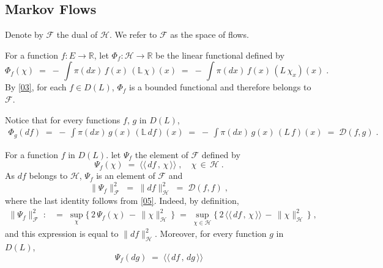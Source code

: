 \documentclass[reqno]{amsart}
\newcounter{as}[section]
\newcommand{\mc}[1]{{\mathcal #1}}
\newcommand{\bb}[1]{{\mathbb #1}}
\newcommand{\ms}[1]{{\mathscr #1}}
\newcommand{\<}{\langle}
\renewcommand{\>}{\rangle}
\newcommand{\cb}[1]{{\color{blue} #1}}
\newcommand{\bel}[2]{\begin{equation} \label{#1} \begin{split} #2
 					\end{split} \end{equation}}
\begin{document}
\subsection{Markov Flows}
Denote by $\ms F$ the dual of $\ms H$. We refer to $\ms F$ as the
space of flows.


For a function $f:E \to \bb R$, let $\Phi_f: \ms H \to \bb R$ be the
linear functional defined by
\begin{equation*}
\Phi_f (\chi) \;=\;- \,\int \pi(dx)\, f(x)\, (\bb L\, \chi)(x)
\;=\; - \,\int \pi(dx)\, f(x)\, ( L\, \chi_x)(x) \;.
\end{equation*}
By \eqref{03}, for each $f\in D(L)$, $\Phi_f$ is a bounded functional
and therefore belongs to $\ms F$. 

Notice that for every functions $f$, $g$ in $D(L)$,
\bel{phig}{
\Phi_g(df) \;=\; 
-\, \int \pi(dx)\, g(x)\, (\bb L \, df)(x) \;=\;
-\, \int \pi(dx)\, g(x)\, (L \, f)(x) \;=\; \mc D(f,g) \;.
}

For a function $f$ in $D(L)$. let $\Psi_f$ the element of $\ms F$
defined by
\begin{equation}
\label{06}
\Psi_f (\chi) \;=\; \<\!\<\, df \,,\, \chi \,\>\!\> \;, \quad
\chi\,\in\, \ms H\;.
\end{equation}
As $df$ belongs to $\ms H$, $\Psi_f$ is an element of $\ms F$ and
\begin{equation}
\label{07}
\|\Psi_f\|_{\ms F}^2 \;=\; \|df\|_{\ms H}^2 \;=\; \ms D(f,f)\;,
\end{equation}
where the last identity follows from \eqref{05}.
Indeed, by definition,
\begin{align*}
\|\Psi_f\|_{\ms F}^2 \;: & =\; \sup_{\chi} \big\{\, 2 \, \Psi_f(\chi) \,-\,
\|\chi\|_{\ms H}^2 \, \big \} 
\; =\; \sup_{\chi\in \ms H} \big\{\, 2 \, \<\!\<\, df \,,\, \chi \,\>\!\>  \,-\,
\|\chi\|_{\ms H}^2 \, \big \} \;,
\end{align*}
and this expression is equal to $\|df\|_{\ms H}^2$. Moreover, for
every function $g$ in $D(L)$,
\begin{equation}
\label{09}
\Psi_f (dg) \;=\; \<\!\<\, df \,,\, dg \,\>\!\>
\end{equation}
\end{document}
